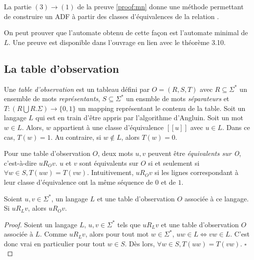 	\begin{corollary}
		La partie $(3)\rightarrow(1)$ de la preuve \ref{proof:mn} donne une méthode permettant de construire un ADF à partir des classes d'équivalences de la relation \rl.
	\end{corollary}

On peut prouver que l'automate obtenu de cette façon est l'automate minimal de $L$. Une preuve est disponible dans l'ouvrage \cite{Hopcroft79} en lien avec le théorème 3.10.



  \subsection{La table d'observation}\label{ss:to}

	Une \emph{table d'observation} est un tableau défini par $O=(R,S,T)$ avec $R\subseteq\Sigma^*$ un ensemble de mots \emph{représentants}, $S\subseteq\Sigma^*$ un ensmble de mots \emph{séparateurs} et $T:(R\bigcup R.\Sigma)\rightarrow\{0,1\}$ un mapping représentant le contenu de la table.\cite{Neider14}
	Soit un langage $L$ qui est en train d'être appris par l'algorithme d'Angluin. Soit un mot $w\in L$. Alors, $w$ appartient à une classe d'équivalence $[[u]]$ avec $u\in L$. Dans ce cas, $T(w)=1$. Au contraire, si $w\notin L$, alors $T(w)=0$.

	Pour une table d'observation $O$, deux mots $u,v$ peuvent être \emph{équivalents sur O}, c'est-à-dire $uR_Ov$. $u$ et $v$ sont équivalents sur $O$ si et seulement si $\forall w \in S, T(uw)=T(vw)$. Intuitivement, $uR_Ov$ si les lignes correspondant à leur classe d'équivalence ont la même séquence de $0$ et de $1$.

	\begin{proposition}
		Soient $u,v \in \Sigma^*$, un langage $L$ et une table d'observation $O$ associée à ce langage. Si $uR_Lv$, alors $uR_Ov$.
	\end{proposition}

	\begin{proof}
		Soient un langage $L$, $u,v \in \Sigma^*$ tels que $uR_Lv$ et une table d'observation $O$ associée à $L$.
		Comme $uR_Lv$, alors pour tout mot $w\in\Sigma^*$, $uw\in L \iff vw\in L$. C'est donc vrai en particulier pour tout $w\in S$. Dès lors, $\forall w \in S, T(uw)=T(vw)$.
		\hfill$\square$
	\end{proof}

